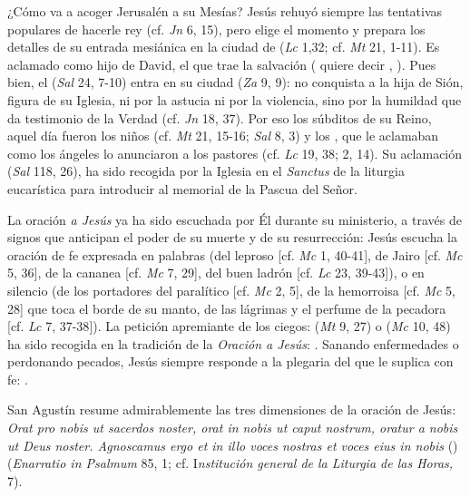 	
	 ¿Cómo va a acoger Jerusalén a su Mesías? Jesús rehuyó siempre las tentativas populares de hacerle rey (cf. \emph{Jn} 6, 15), pero elige el momento y prepara los detalles de su entrada mesiánica en la ciudad de  (\emph{Lc} 1,32; cf. \emph{Mt} 21, 1-11). Es aclamado como hijo de David, el que trae la salvación ( quiere decir , ). Pues bien, el  (\emph{Sal} 24, 7-10) entra en su ciudad  (\emph{Za} 9, 9): no conquista a la hija de Sión, figura de su Iglesia, ni por la astucia ni por la violencia, sino por la humildad que da testimonio de la Verdad (cf. \emph{Jn} 18, 37). Por eso los súbditos de su Reino, aquel día fueron los niños (cf. \emph{Mt} 21, 15-16; \emph{Sal} 8, 3) y los , que le aclamaban como los ángeles lo anunciaron a los pastores (cf. \emph{Lc} 19, 38; 2, 14). Su aclamación  (\emph{Sal} 118, 26), ha sido recogida por la Iglesia en el \emph{Sanctus} de la liturgia eucarística para introducir al memorial de la Pascua del Señor.
	
	
	 La oración \emph{a Jesús} ya ha sido escuchada por Él durante su ministerio, a través de signos que anticipan el poder de su muerte y de su resurrección: Jesús escucha la oración de fe expresada en palabras (del leproso {[}cf. \emph{Mc} 1, 40-41{]}, de Jairo {[}cf. \emph{Mc} 5, 36{]}, de la cananea {[}cf. \emph{Mc} 7, 29{]}, del buen ladrón {[}cf. \emph{Lc} 23, 39-43{]}), o en silencio (de los portadores del paralítico {[}cf. \emph{Mc} 2, 5{]}, de la hemorroisa {[}cf. \emph{Mc} 5, 28{]} que toca el borde de su manto, de las lágrimas y el perfume de la pecadora {[}cf. \emph{Lc} 7, 37-38{]}). La petición apremiante de los ciegos:  (\emph{Mt} 9, 27) o  (\emph{Mc} 10, 48) ha sido recogida en la tradición de la \emph{Oración a Jesús}: . Sanando enfermedades o perdonando pecados, Jesús siempre responde a la plegaria del que le suplica con fe: .
	
	San Agustín resume admirablemente las tres dimensiones de la oración de Jesús: \emph{Orat pro nobis ut sacerdos noster, orat in nobis ut caput nostrum, oratur a nobis ut Deus noster. Agnoscamus ergo et in illo voces nostras et voces eius in nobis} () (\emph{Enarratio in Psalmum} 85, 1; cf. I\emph{nstitución general de la Liturgia de las Horas,} 7).
	

